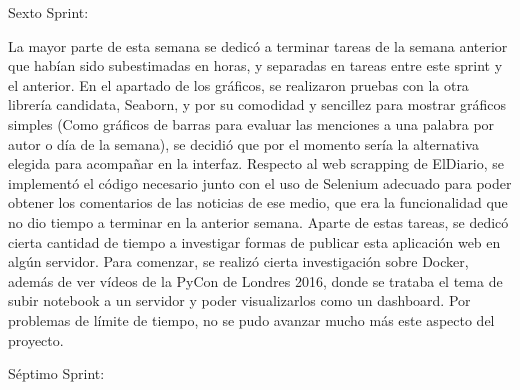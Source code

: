 Sexto Sprint:

La mayor parte de esta semana se dedicó a terminar tareas de la semana anterior que habían sido subestimadas en horas, y separadas en tareas entre este sprint y el anterior.
En el apartado de los gráficos, se realizaron pruebas con la otra librería candidata, Seaborn, y por su comodidad y sencillez para mostrar gráficos simples (Como gráficos de barras para evaluar las menciones a una palabra por autor o día de la semana), se decidió que por el momento sería la alternativa elegida para acompañar en la interfaz.
Respecto al web scrapping de ElDiario, se implementó el código necesario junto con el uso de Selenium adecuado para poder obtener los comentarios de las noticias de ese medio, que era la funcionalidad que no dio tiempo a terminar en la anterior semana.
Aparte de estas tareas, se dedicó cierta cantidad de tiempo a investigar formas de publicar esta aplicación web en algún servidor. Para comenzar, se realizó cierta investigación sobre Docker, además de ver vídeos de la PyCon de Londres 2016, donde se trataba el tema de subir notebook a un servidor y poder visualizarlos como un dashboard. Por problemas de límite de tiempo, no se pudo avanzar mucho más este aspecto del proyecto.

Séptimo Sprint:

